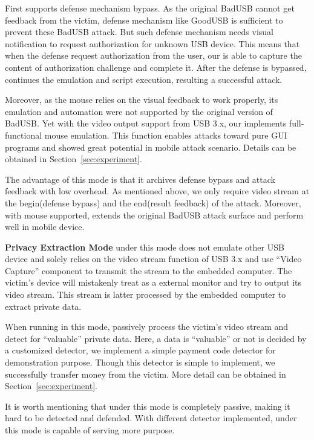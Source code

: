 First \tool supports defense mechanism bypass. As the original BadUSB cannot get feedback from the victim, defense mechanism like GoodUSB \cite{tian2015defending} is sufficient to prevent these BadUSB attack. But such defense mechanism needs visual notification to request authorization for unknown USB device. This means that when the defense request authorization from the user, our \tool is able to capture the content of authorization challenge and complete it. After the defense is bypassed, \tool continues the emulation and script execution, resulting a successful attack.

Moreover, as the mouse relies on the visual feedback to work properly, its emulation and automation were not supported by the original version of BadUSB. Yet with the video output support from USB 3.x, our \tool implements full-functional mouse emulation. This function enables attacks toward pure GUI programs and showed great potential in mobile attack scenario. Details can be obtained in Section~\ref{sec:experiment}.

The advantage of this mode is that it archives defense bypass and attack feedback with low overhead. As mentioned above, we only require video stream at the begin(defense bypass) and the end(result feedback) of the attack. Moreover, with mouse supported, \tool extends the original BadUSB attack surface and perform well in mobile device.

\textbf{Privacy Extraction Mode}
\tool under this mode does not emulate other USB device and solely relies on the video stream function of USB 3.x and use ``Video Capture'' component to transmit the stream to the embedded computer. The victim's device will mistakenly treat \tool as a external monitor and try to output its video stream. This stream is latter processed by the embedded computer to extract private data.

When running in this mode, \tool passively process the victim's video stream and detect for ``valuable'' private data.  Here, a data is ``valuable'' or not is decided by a customized detector, we implement a simple payment code detector for demonstration purpose. Though this detector is simple to implement, we successfully transfer money from the victim. More detail can be obtained in Section~\ref{sec:experiment}.

It is worth mentioning that \tool under this mode is completely passive, making it hard to be detected and defended. With different detector implemented, \tool under this mode is capable of serving more purpose.

